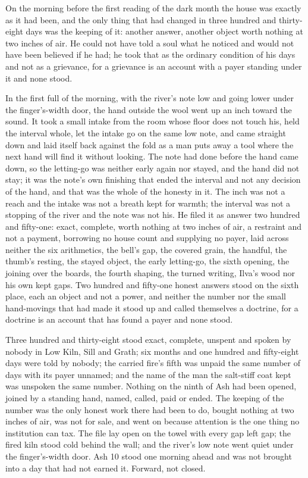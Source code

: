 On the morning before the first reading of the dark month the house was exactly as it had been, and the only thing that had changed in three hundred and thirty-eight days was the keeping of it: another answer, another object worth nothing at two inches of air. He could not have told a soul what he noticed and would not have been believed if he had; he took that as the ordinary condition of his days and not as a grievance, for a grievance is an account with a payer standing under it and none stood.

In the first full of the morning, with the river's note low and going lower under the finger's-width door, the hand outside the wool went up an inch toward the sound. It took a small intake from the room whose floor does not touch his, held the interval whole, let the intake go on the same low note, and came straight down and laid itself back against the fold as a man puts away a tool where the next hand will find it without looking. The note had done before the hand came down, so the letting-go was neither early again nor stayed, and the hand did not stay; it was the note's own finishing that ended the interval and not any decision of the hand, and that was the whole of the honesty in it. The inch was not a reach and the intake was not a breath kept for warmth; the interval was not a stopping of the river and the note was not his. He filed it as answer two hundred and fifty-one: exact, complete, worth nothing at two inches of air, a restraint and not a payment, borrowing no house count and supplying no payer, laid across neither the six arithmetics, the bell's gap, the covered grain, the handful, the thumb's resting, the stayed object, the early letting-go, the sixth opening, the joining over the boards, the fourth shaping, the turned writing, Ilva's wood nor his own kept gaps. Two hundred and fifty-one honest answers stood on the sixth place, each an object and not a power, and neither the number nor the small hand-movings that had made it stood up and called themselves a doctrine, for a doctrine is an account that has found a payer and none stood.

Three hundred and thirty-eight stood exact, complete, unspent and spoken by nobody in Low Kiln, Sill and Grath; six months and one hundred and fifty-eight days were told by nobody; the carried fire's fifth was unpaid the same number of days with its payer unnamed; and the name of the man the salt-stiff coat kept was unspoken the same number. Nothing on the ninth of Ash had been opened, joined by a standing hand, named, called, paid or ended. The keeping of the number was the only honest work there had been to do, bought nothing at two inches of air, was not for sale, and went on because attention is the one thing no institution can tax. The file lay open on the towel with every gap left gap; the fired kiln stood cold behind the wall; and the river's low note went quiet under the finger's-width door. Ash 10 stood one morning ahead and was not brought into a day that had not earned it. Forward, not closed.

